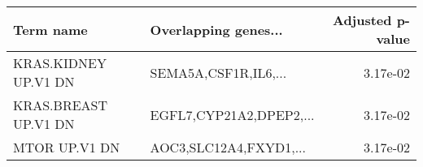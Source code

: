 \begin{tabular}{llr}
\toprule
           Term name &    Overlapping genes... &  Adjusted p-value \\
\midrule
KRAS.KIDNEY UP.V1 DN &    SEMA5A,CSF1R,IL6,... &          3.17e-02 \\
KRAS.BREAST UP.V1 DN & EGFL7,CYP21A2,DPEP2,... &          3.17e-02 \\
       MTOR UP.V1 DN &  AOC3,SLC12A4,FXYD1,... &          3.17e-02 \\
\bottomrule
\end{tabular}
